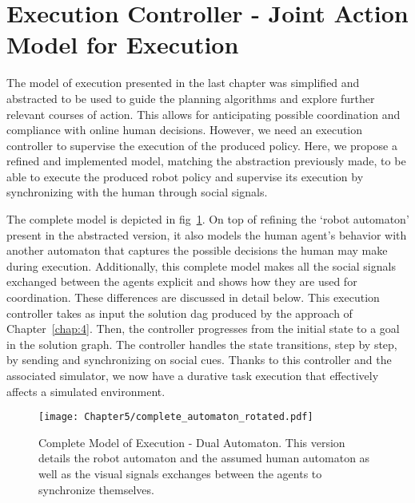 \section{Execution Controller - Joint Action Model for Execution}

The model of execution presented in the last chapter was simplified and abstracted to be used to guide the planning algorithms and explore further relevant courses of action. This allows for anticipating possible coordination and compliance with online human decisions. 
However, we need an execution controller to supervise the execution of the produced policy. Here, we propose a refined and implemented model, matching the abstraction previously made, to be able to execute the produced robot policy and supervise its execution by synchronizing with the human through social signals.

The complete model is depicted in fig~\ref{fig:complete_model_exec}. On top of refining the `robot automaton' present in the abstracted version, it also models the human agent's behavior with another automaton that captures the possible decisions the human may make during execution. Additionally, this complete model makes all the social signals exchanged between the agents explicit and shows how they are used for coordination. These differences are discussed in detail below. This execution controller takes as input the solution \acrshort{dag} produced by the approach of Chapter~\ref{chap:4}. Then, the controller progresses from the initial state to a goal in the solution graph. The controller handles the state transitions, step by step, by sending and synchronizing on social cues. Thanks to this controller and the associated simulator, we now have a durative task execution that effectively affects a simulated environment.


\begin{figure}
    \centering
    \texttt{[image: Chapter5/complete\_automaton\_rotated.pdf]}
    \caption{Complete Model of Execution - Dual Automaton. This version details the robot automaton and the assumed human automaton as well as the visual signals exchanges between the agents to synchronize themselves.}
    \label{fig:complete_model_exec}
\end{figure}


